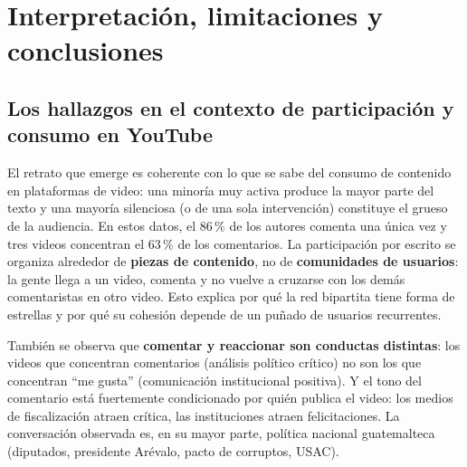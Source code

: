 \documentclass[11pt,a4paper]{article}
\begin{document}
\section{Interpretaci\'on, limitaciones y conclusiones}

\subsection{Los hallazgos en el contexto de participaci\'on y consumo en YouTube}
El retrato que emerge es coherente con lo que se sabe del consumo de contenido en plataformas de video:
una minor\'ia muy activa produce la mayor parte del texto y una mayor\'ia silenciosa (o de una sola
intervenci\'on) constituye el grueso de la audiencia. En estos datos, el 86\,\% de los autores comenta
una \'unica vez y tres videos concentran el 63\,\% de los comentarios. La participaci\'on por escrito
se organiza alrededor de \textbf{piezas de contenido}, no de \textbf{comunidades de usuarios}: la gente
llega a un video, comenta y no vuelve a cruzarse con los dem\'as comentaristas en otro video. Esto
explica por qu\'e la red bipartita tiene forma de estrellas y por qu\'e su cohesi\'on depende de un
pu\~nado de usuarios recurrentes.

Tambi\'en se observa que \textbf{comentar y reaccionar son conductas distintas}: los videos que
concentran comentarios (an\'alisis pol\'itico cr\'itico) no son los que concentran ``me gusta''
(comunicaci\'on institucional positiva). Y el tono del comentario est\'a fuertemente condicionado por
qui\'en publica el video: los medios de fiscalizaci\'on atraen cr\'itica, las instituciones atraen
felicitaciones. La conversaci\'on observada es, en su mayor parte, pol\'itica nacional guatemalteca
(diputados, presidente Ar\'evalo, pacto de corruptos, USAC).
\end{document}
